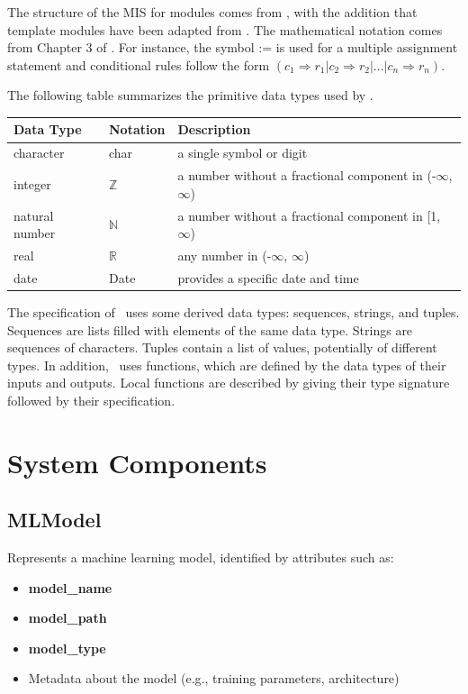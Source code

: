 \documentclass[12pt, titlepage]{article}
\begin{document}

The structure of the MIS for modules comes from \citet{HoffmanAndStrooper1995},
with the addition that template modules have been adapted from
\cite{GhezziEtAl2003}.  The mathematical notation comes from Chapter 3 of
\citet{HoffmanAndStrooper1995}.  For instance, the symbol := is used for a
multiple assignment statement and conditional rules follow the form $(c_1
\Rightarrow r_1 | c_2 \Rightarrow r_2 | ... | c_n \Rightarrow r_n )$.

The following table summarizes the primitive data types used by \progname. 

\begin{center}
\renewcommand{\arraystretch}{1.2}
\noindent 
\begin{tabular}{l l p{7.5cm}} 
\toprule 
\textbf{Data Type} & \textbf{Notation} & \textbf{Description}\\ 
\midrule
character & char & a single symbol or digit\\
integer & $\mathbb{Z}$ & a number without a fractional component in (-$\infty$, $\infty$) \\
natural number & $\mathbb{N}$ & a number without a fractional component in [1, $\infty$) \\
real & $\mathbb{R}$ & any number in (-$\infty$, $\infty$)\\
date & Date & provides a specific date and time\\
\bottomrule
\end{tabular} 
\end{center}

\noindent
The specification of \progname \ uses some derived data types: sequences, strings, and
tuples. Sequences are lists filled with elements of the same data type. Strings
are sequences of characters. Tuples contain a list of values, potentially of
different types. In addition, \progname \ uses functions, which
are defined by the data types of their inputs and outputs. Local functions are
described by giving their type signature followed by their specification.

\section*{System Components}

\subsection*{MLModel}
Represents a machine learning model, identified by attributes such as:
\begin{itemize}
    \item \textbf{model\_name}
    \item \textbf{model\_path}
    \item \textbf{model\_type}
    \item Metadata about the model (e.g., training parameters, architecture)
\end{itemize}
\end{document}
